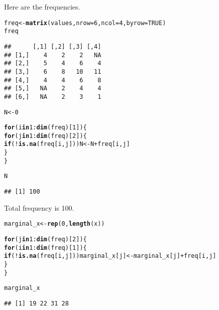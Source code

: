 \documentclass[11pt, a4paper]{article}\usepackage[]{graphicx}\usepackage[]{xcolor}
\makeatletter
\newcommand{\hlnum}[1]{\textcolor[rgb]{0.686,0.059,0.569}{#1}}%
\newcommand{\hlopt}[1]{\textcolor[rgb]{0,0,0}{#1}}%
\newcommand{\hldef}[1]{\textcolor[rgb]{0.345,0.345,0.345}{#1}}%
\newcommand{\hlkwa}[1]{\textcolor[rgb]{0.161,0.373,0.58}{\textbf{#1}}}%
\newcommand{\hlkwb}[1]{\textcolor[rgb]{0.69,0.353,0.396}{#1}}%
\newcommand{\hlkwc}[1]{\textcolor[rgb]{0.333,0.667,0.333}{#1}}%
\newcommand{\hlkwd}[1]{\textcolor[rgb]{0.737,0.353,0.396}{\textbf{#1}}}%
\newenvironment{kframe}{%
 \def\at@end@of@kframe{}%
 \ifinner\ifhmode%
  \def\at@end@of@kframe{\end{minipage}}%
  \begin{minipage}{\columnwidth}%
 \fi\fi%
 \def\FrameCommand##1{\hskip\@totalleftmargin \hskip-\fboxsep
 \colorbox{shadecolor}{##1}\hskip-\fboxsep
     \hskip-\linewidth \hskip-\@totalleftmargin \hskip\columnwidth}%
 \MakeFramed {\advance\hsize-\width
   \@totalleftmargin\z@ \linewidth\hsize
   \@setminipage}}%
 {\par\unskip\endMakeFramed%
 \at@end@of@kframe}
\newenvironment{knitrout}{}{} %
\makeatother
\begin{document}
Here are the frequencies.
\begin{knitrout}
\color{fgcolor}\begin{kframe}
\begin{alltt}
\hldef{freq} \hlkwb{<-} \hlkwd{matrix}\hldef{(values,} \hlkwc{nrow} \hldef{=} \hlnum{6}\hldef{,} \hlkwc{ncol} \hldef{=} \hlnum{4}\hldef{,} \hlkwc{byrow} \hldef{=} \hlnum{TRUE}\hldef{)}
\hldef{freq}
\end{alltt}
\begin{verbatim}
##      [,1] [,2] [,3] [,4]
## [1,]    4    2    2   NA
## [2,]    5    4    6    4
## [3,]    6    8   10   11
## [4,]    4    4    6    8
## [5,]   NA    2    4    4
## [6,]   NA    2    3    1
\end{verbatim}
\end{kframe}
\end{knitrout}

\begin{knitrout}
\color{fgcolor}\begin{kframe}
\begin{alltt}
\hldef{N} \hlkwb{<-} \hlnum{0}

\hlkwa{for} \hldef{(i} \hlkwa{in} \hlnum{1}\hlopt{:}\hlkwd{dim}\hldef{(freq)[}\hlnum{1}\hldef{]) \{}
  \hlkwa{for} \hldef{(j} \hlkwa{in} \hlnum{1}\hlopt{:}\hlkwd{dim}\hldef{(freq)[}\hlnum{2}\hldef{]) \{}
    \hlkwa{if}\hldef{(}\hlopt{!}\hlkwd{is.na}\hldef{(freq[i, j])) N} \hlkwb{<-} \hldef{N} \hlopt{+} \hldef{freq[i, j]}
  \hldef{\}}
\hldef{\}}

\hldef{N}
\end{alltt}
\begin{verbatim}
## [1] 100
\end{verbatim}
\end{kframe}
\end{knitrout}

Total frequency is 100.

\begin{knitrout}
\color{fgcolor}\begin{kframe}
\begin{alltt}
\hldef{marginal_x} \hlkwb{<-} \hlkwd{rep}\hldef{(}\hlnum{0}\hldef{,} \hlkwd{length}\hldef{(x))}

\hlkwa{for} \hldef{(j} \hlkwa{in} \hlnum{1}\hlopt{:}\hlkwd{dim}\hldef{(freq)[}\hlnum{2}\hldef{]) \{}
  \hlkwa{for} \hldef{(i} \hlkwa{in} \hlnum{1}\hlopt{:}\hlkwd{dim}\hldef{(freq)[}\hlnum{1}\hldef{]) \{}
    \hlkwa{if}\hldef{(}\hlopt{!}\hlkwd{is.na}\hldef{(freq[i, j])) marginal_x[j]} \hlkwb{<-} \hldef{marginal_x[j]} \hlopt{+} \hldef{freq[i, j]}
  \hldef{\}}
\hldef{\}}

\hldef{marginal_x}
\end{alltt}
\begin{verbatim}
## [1] 19 22 31 28
\end{verbatim}
\end{kframe}
\end{knitrout}
\end{document}
